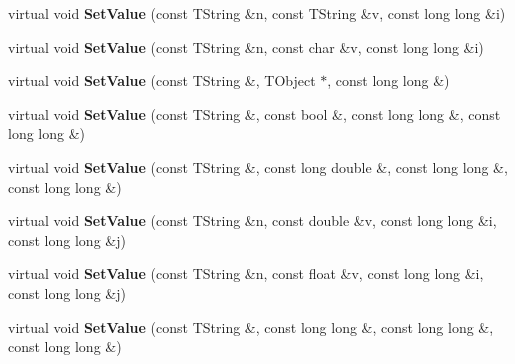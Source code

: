 \begin{DoxyCompactItemize}
\item 
\hypertarget{class_h_a_l_1_1_analysis_data_a985317d132d7c150e61f869db7fa8197}{virtual void {\bfseries Set\-Value} (const T\-String \&n, const T\-String \&v, const long long \&i)}\label{class_h_a_l_1_1_analysis_data_a985317d132d7c150e61f869db7fa8197}

\item 
\hypertarget{class_h_a_l_1_1_analysis_data_ae67a81418f6b826dd9b04f4c1e6f6f43}{virtual void {\bfseries Set\-Value} (const T\-String \&n, const char \&v, const long long \&i)}\label{class_h_a_l_1_1_analysis_data_ae67a81418f6b826dd9b04f4c1e6f6f43}

\item 
\hypertarget{class_h_a_l_1_1_analysis_data_adb01a8781d1c24a520bcc1b2518b64d2}{virtual void {\bfseries Set\-Value} (const T\-String \&, T\-Object $\ast$, const long long \&)}\label{class_h_a_l_1_1_analysis_data_adb01a8781d1c24a520bcc1b2518b64d2}

\item 
\hypertarget{class_h_a_l_1_1_analysis_data_a8d9a745e5e829f20b1e2e5fd5651b5cb}{virtual void {\bfseries Set\-Value} (const T\-String \&, const bool \&, const long long \&, const long long \&)}\label{class_h_a_l_1_1_analysis_data_a8d9a745e5e829f20b1e2e5fd5651b5cb}

\item 
\hypertarget{class_h_a_l_1_1_analysis_data_ad81a9423de201ecd3993c69c4cbefe6c}{virtual void {\bfseries Set\-Value} (const T\-String \&, const long double \&, const long long \&, const long long \&)}\label{class_h_a_l_1_1_analysis_data_ad81a9423de201ecd3993c69c4cbefe6c}

\item 
\hypertarget{class_h_a_l_1_1_analysis_data_a53d8939f8a64262857f13025f1f040da}{virtual void {\bfseries Set\-Value} (const T\-String \&n, const double \&v, const long long \&i, const long long \&j)}\label{class_h_a_l_1_1_analysis_data_a53d8939f8a64262857f13025f1f040da}

\item 
\hypertarget{class_h_a_l_1_1_analysis_data_a0089459ec31db3ea3c5dd974502ba651}{virtual void {\bfseries Set\-Value} (const T\-String \&n, const float \&v, const long long \&i, const long long \&j)}\label{class_h_a_l_1_1_analysis_data_a0089459ec31db3ea3c5dd974502ba651}

\item 
\hypertarget{class_h_a_l_1_1_analysis_data_a04aaec235f3100f4324bc502764fe00f}{virtual void {\bfseries Set\-Value} (const T\-String \&, const long long \&, const long long \&, const long long \&)}\label{class_h_a_l_1_1_analysis_data_a04aaec235f3100f4324bc502764fe00f}


\end{DoxyCompactItemize}
